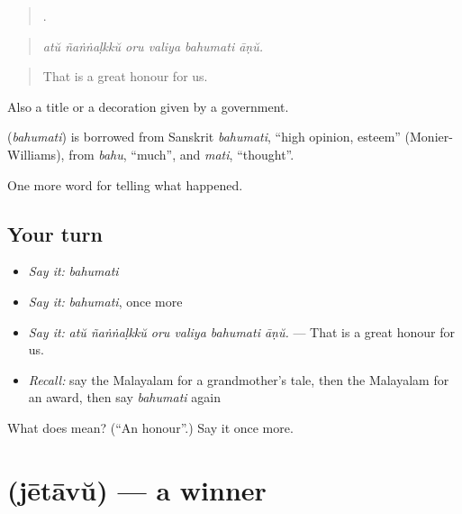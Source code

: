 \begin{quote}
     .
\end{quote}

\begin{quote}
\emph{atŭ ñaṅṅaḷkkŭ oru valiya bahumati āṇŭ.}
\end{quote}

\begin{quote}
That is a great honour for us.
\end{quote}

Also a title or a decoration given by a government.

\begin{cousinweb}
\textbf{} (\emph{bahumati}) is borrowed from Sanskrit \emph{bahumati}, \textquotedblleft{}high opinion, esteem\textquotedblright{} (Monier-Williams), from \emph{bahu}, \textquotedblleft{}much\textquotedblright{}, and \emph{mati}, \textquotedblleft{}thought\textquotedblright{}.
\end{cousinweb}

\begin{grammarlens}[title={What you've built}]
One more word for telling what happened.
\end{grammarlens}

\subsection*{Your turn}
\begin{itemize}
\raggedright
  \item \emph{Say it:} \emph{bahumati}
  \item \emph{Say it:} \emph{bahumati}, once more
  \item \emph{Say it:} \emph{atŭ ñaṅṅaḷkkŭ oru valiya bahumati āṇŭ.} — That is a great honour for us.
  \item \emph{Recall:} say the Malayalam for a grandmother's tale, then the Malayalam for an award, then say \emph{bahumati} again
\end{itemize}

\begin{tcolorbox}[breakable,colback=teal!4,colframe=teal!35!black,title={Before you move on}]
What does  mean? (\textquotedblleft{}An honour\textquotedblright{}.) Say it once more.
\end{tcolorbox}
\section[\texorpdfstring{\ml{ജേതാവ്} (jētāvŭ)}{ജേതാവ് (jētāvŭ)}]{ (jētāvŭ) — a winner}

